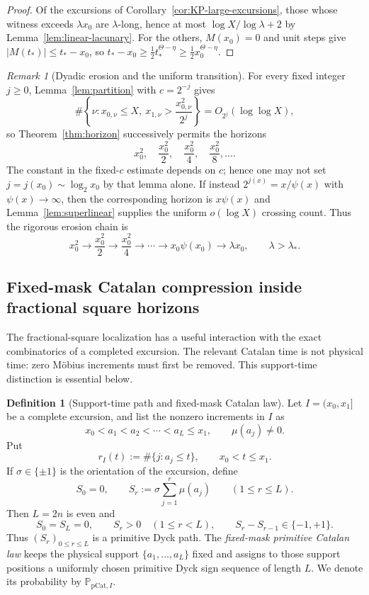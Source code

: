 \documentclass[11pt]{amsart}
\numberwithin{equation}{section}
\theoremstyle{plain}
\theoremstyle{definition}
\newtheorem{definition}[theorem]{Definition}
\theoremstyle{remark}
\newtheorem{remark}[theorem]{Remark}
\begin{document}
\begin{proof}
Of the excursions of Corollary~\ref{cor:KP-large-excursions}, those whose
witness exceeds $\lambda x_0$ are $\lambda$-long, hence at most
$\log X/\log\lambda+2$ by Lemma~\ref{lem:linear-lacunary}. For the others,
$M(x_0)=0$ and unit steps give $|M(t_*)|\le t_*-x_0$, so
$t_*-x_0\ge\frac12t_*^{\Theta-\eta}\ge\frac12x_0^{\Theta-\eta}$.
\end{proof}


\begin{remark}[Dyadic erosion and the uniform transition]
\label{rem:dyadic-erosion}
For every fixed integer $j\ge0$, Lemma~\ref{lem:partition} with
$c=2^{-j}$ gives
\[
\#\left\{\nu:x_{0,\nu}\le X,\ x_{1,\nu}>
\frac{x_{0,\nu}^2}{2^j}\right\}=O_{2^j}(\log\log X),
\]
so Theorem~\ref{thm:horizon} successively permits the horizons
\[
x_0^2,\quad \frac{x_0^2}{2},\quad \frac{x_0^2}{4},\quad
\frac{x_0^2}{8},\ldots.
\]
The constant in the fixed-$c$ estimate depends on $c$; hence one may not set
$j=j(x_0)\sim\log_2x_0$ by that lemma alone.  If instead
$2^{j(x)}=x/\psi(x)$ with $\psi(x)\to\infty$, then the corresponding
horizon is $x\psi(x)$ and Lemma~\ref{lem:superlinear} supplies the uniform
$o(\log X)$ crossing count.  Thus the rigorous erosion chain is
\[
x_0^2\to\frac{x_0^2}{2}\to\frac{x_0^2}{4}\to\cdots
\to x_0\psi(x_0)\to\lambda x_0,\qquad\lambda>\lambda_*.
\]
\end{remark}

\subsection{Fixed-mask Catalan compression inside fractional square horizons}
\label{subsec:catalan-square}

The fractional-square localization has a useful interaction with the exact
combinatorics of a completed excursion.  The relevant Catalan time is not
physical time: zero M\"obius increments must first be removed.  This
support-time distinction is essential below.

\begin{definition}[Support-time path and fixed-mask Catalan law]
\label{def:support-catalan}
Let $I=(x_0,x_1]$ be a complete excursion, and list the nonzero increments in
$I$ as
\[
 x_0<a_1<a_2<\cdots<a_L\le x_1,
 \qquad \mu(a_j)\ne0.
\]
Put
\[
 r_I(t):=\#\{j:a_j\le t\},\qquad x_0<t\le x_1.
\]
If $\sigma\in\{\pm1\}$ is the orientation of the excursion, define
\[
 S_0=0,\qquad
 S_r:=\sigma\sum_{j=1}^r\mu(a_j)\qquad(1\le r\le L).
\]
Then $L=2n$ is even and
\[
 S_0=S_L=0,\qquad S_r>0\quad(1\le r<L),\qquad
 S_r-S_{r-1}\in\{-1,+1\}.
\]
Thus $(S_r)_{0\le r\le L}$ is a primitive Dyck path.  The
\emph{fixed-mask primitive Catalan law} keeps the physical support
$\{a_1,\dots,a_L\}$ fixed and assigns to those support positions a uniformly
chosen primitive Dyck sign sequence of length $L$.  We denote its probability
by $\mathbb P_{\mathrm{pCat},I}$.
\end{definition}
\end{document}
